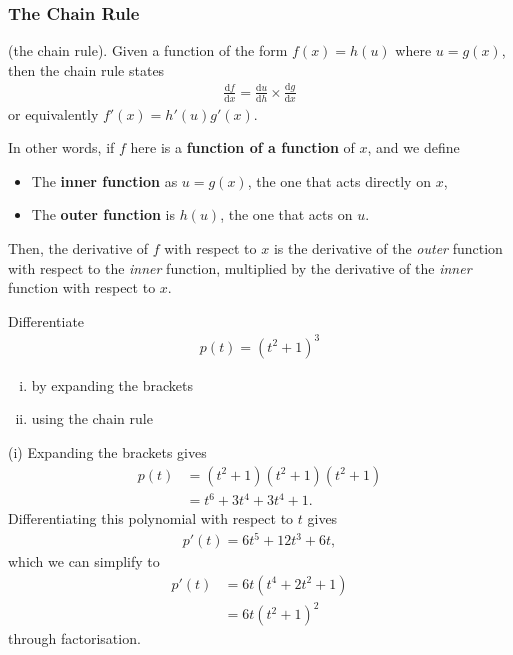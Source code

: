 \subsubsection{The Chain Rule}

\begin{definition}
    (the chain rule). Given a function of the form $f(x)=h(u)$ where $u=g(x)$,  then the chain rule states
\begin{align}
    \frac{\mathrm{d}f}{\mathrm{d}x} = \frac{\mathrm{d}u}{\mathrm{d}h} \times \frac{\mathrm{d}g}{\mathrm{d}x}
\end{align}
or equivalently $f'(x)=h'(u)g'(x)$. 
\end{definition}

In other words, if $f$ here is a \textbf{function of a function} of $x$, and we define
\begin{itemize}
    \item The \textbf{inner function} as $u=g(x)$, the one that acts directly on $x$,
    \item The \textbf{outer function} is $h(u)$, the one that acts on $u$.
\end{itemize}
Then, the derivative of $f$ with respect to $x$ is the derivative of the \textit{outer} function with respect to the \textit{inner} function, multiplied by the derivative of the \textit{inner} function with respect to $x$. 

\begin{example}
    Differentiate
    \begin{align*}
        p(t) = (t^2+1)^3
    \end{align*}
\begin{enumerate}[(i)]
    \item by expanding the brackets
    \item using the chain rule
\end{enumerate}
\end{example}

(i) Expanding the brackets gives 
\begin{align*}
    p(t) &= (t^2+1)(t^2+1)(t^2+1)\\
    &= t^6+3t^4+3t^4+1.
\end{align*} 
Differentiating this polynomial with respect to $t$ gives 
\begin{align*}
    p'(t) = 6t^5 + 12t^3 + 6t,
\end{align*}
which we can simplify to
\begin{align*}
p'(t) &= 6t(t^4+2t^2+1)\\
&=6t(t^2+1)^2
\end{align*}
through factorisation.\\

